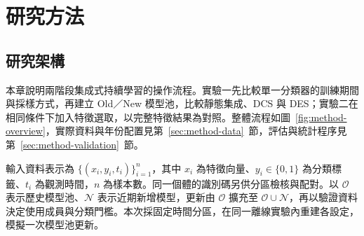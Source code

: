 \chapter{研究方法}\label{chap:method}
\begingroup
\setlength{\emergencystretch}{2em}

\section{研究架構}\label{sec:method-framework}

本章說明兩階段集成式持續學習的操作流程。實驗一先比較單一分類器的訓練期間與採樣方式，再建立 Old／New 模型池，比較靜態集成、DCS 與 DES；實驗二在相同條件下加入特徵選取，以完整特徵結果為對照。整體流程如圖~\ref{fig:method-overview}，實際資料與年份配置見第~\ref{sec:method-data}~節，評估與統計程序見第~\ref{sec:method-validation}~節。

輸入資料表示為 \(\{(x_i,y_i,t_i)\}_{i=1}^{n}\)，其中 \(x_i\) 為特徵向量、\(y_i\in\{0,1\}\) 為分類標籤、\(t_i\) 為觀測時間，\(n\) 為樣本數。同一個體的識別碼另供分區檢核與配對。以 \(\mathcal{O}\) 表示歷史模型池、\(\mathcal{N}\) 表示近期新增模型，更新由 \(\mathcal{O}\) 擴充至 \(\mathcal{O}\cup\mathcal{N}\)，再以驗證資料決定使用成員與分類門檻。本次採固定時間分區，在同一離線實驗內重建各設定，模擬一次模型池更新。

